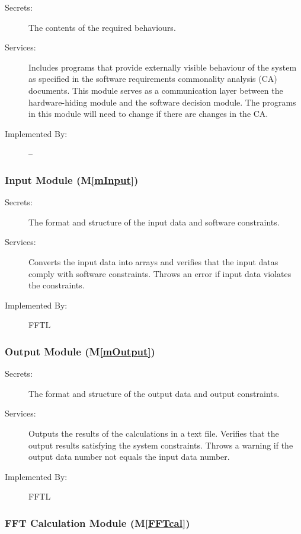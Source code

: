 \documentclass[12pt, titlepage]{article}
\newcommand{\mref}[1]{M\ref{#1}}
\begin{document}
\begin{description}
\item[Secrets:]The contents of the required behaviours.
\item[Services:]Includes programs that provide externally visible behaviour of
  the system as specified in the software requirements commonality analysis (CA)
  documents. This module serves as a communication layer between the
  hardware-hiding module and the software decision module. The programs in this
  module will need to change if there are changes in the CA.
\item[Implemented By:] --
\end{description}

\subsubsection{Input  Module (\mref{mInput})}

\begin{description}
\item[Secrets:]The format and structure of the input data and software constraints.
\item[Services:]Converts the input data into arrays and verifies that the input datas comply with software
  constraints. Throws an error if input data violates the constraints. 
\item[Implemented By:] FFTL
\end{description}


\subsubsection{Output Module (\mref{mOutput})}

\begin{description}
\item[Secrets:] The format and structure of the output data and output constraints.
\item[Services:] Outputs the results of the calculations in a text file. Verifies that the output results satisfying the system constraints. Throws a warning if the output data number not equals the input data number.
\item[Implemented By:] FFTL
\end{description} 

\subsubsection{FFT Calculation Module (\mref{FFTcal})}
\end{document}
